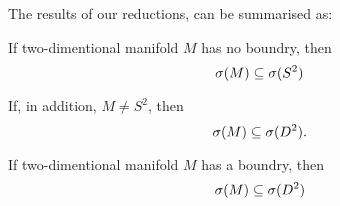 The results of our reductions, can be summarised as:
\begin{observation}\label{sum of spectras}
If two-dimentional manifold $M$ has no boundry, then
\begin{equation} 
{{\sigma}(M)} \subseteq {{\sigma}(S^2)} 
\end{equation} 

If, in addition, $M \neq S^2$, then 
\begin{equation} 
{{\sigma}(M)} \subseteq {{\sigma}(D^2)}. 
\end{equation}

\end{observation}
\begin{observation}
If two-dimentional manifold  $M$ has a boundry, then 
\begin{equation}
{{\sigma}(M)} \subseteq {{\sigma}(D^2)}
\end{equation}
\end{observation}


